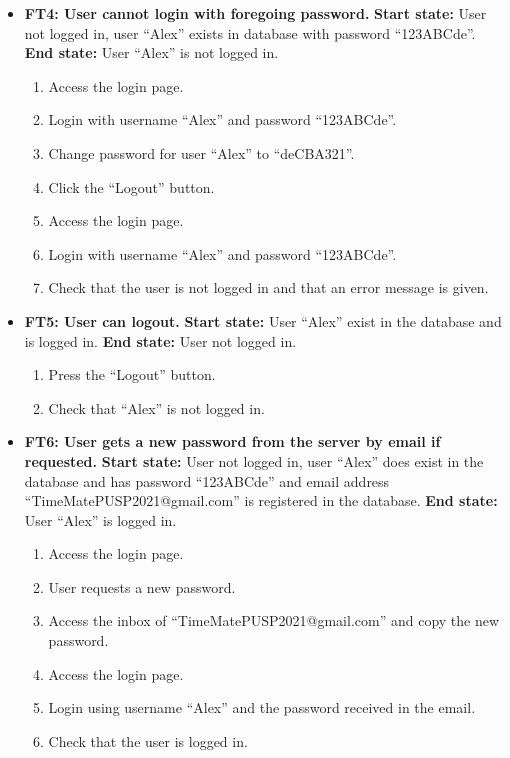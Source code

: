 \documentclass{article}
\begin{document}
\begin{itemize}
		\item \textbf{FT4: User cannot login with foregoing password.} \newline
		\textbf{Start state:} User not logged in, user “Alex” exists in database with password “123ABCde”.  \newline
		\textbf{End state:} User “Alex” is not logged in.   
		\begin{enumerate}
			\item Access the login page. 
			\item Login with username “Alex” and password “123ABCde”.
			\item Change password for user “Alex” to “deCBA321”.
			\item Click the “Logout” button.
			\item Access the login page. 
			\item Login with username “Alex” and password “123ABCde”.
			\item Check that the user is not logged in and that an error message is given. 
		\end{enumerate}
		
		\item \textbf{FT5: User can logout.} \newline
		\textbf{Start state:} User “Alex” exist in the database and is logged in. \newline
		\textbf{End state:} User not logged in.   
		\begin{enumerate}
			\item Press the “Logout” button. 
			\item Check that “Alex” is not logged in. 
		\end{enumerate}
		
		\item \textbf{FT6: User gets a new password from the server by email if requested.} \newline
		\textbf{Start state:} User not logged in, user “Alex” does exist in the database and has password “123ABCde” and email address “TimeMatePUSP2021@gmail.com” is registered in the database.\newline
		\textbf{End state:}  User “Alex” is logged in.  
		\begin{enumerate}
			\item Access the login page. 
			\item User requests a new password.
			\item Access the inbox of “TimeMatePUSP2021@gmail.com” and copy the new password.
			\item Access the login page.
			\item Login using username “Alex” and the password received in the email.
			\item Check that the user is logged in. 
		\end{enumerate}
		

\end{itemize}
\end{document}
